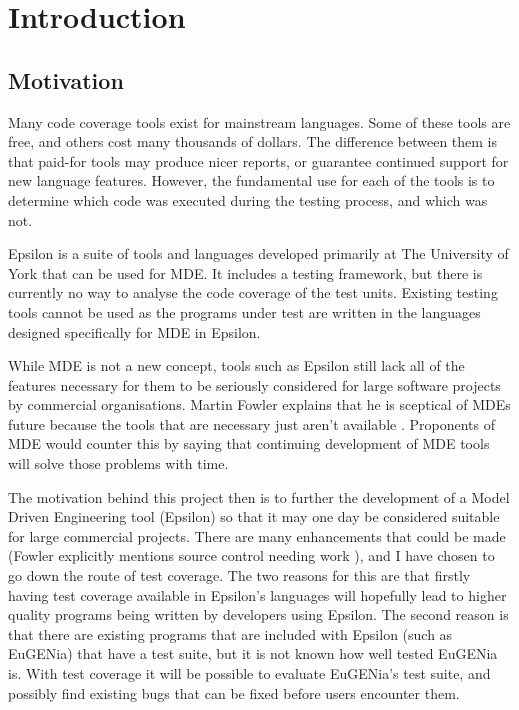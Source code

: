 \chapter{Introduction}

\section{Motivation}

Many code coverage tools exist for mainstream languages. Some of these tools are free, and others cost many thousands of dollars. The difference between them is that paid-for tools may produce nicer reports, or guarantee continued support for new language features. However, the fundamental use for each of the tools is to determine which code was executed during the testing process, and which was not.

Epsilon is a suite of tools and languages developed primarily at The University of York that can be used for \ac{MDE}. It includes a testing framework, but there is currently no way to analyse the code coverage of the test units. Existing testing tools cannot be used as the programs under test are written in the languages designed specifically for MDE in Epsilon.

While \ac{MDE} is not a new concept, tools such as Epsilon still lack all of the features necessary for them to be seriously considered for large software projects by commercial organisations. Martin Fowler explains that he is sceptical of \acp{MDE} future because the tools that are necessary just aren't available \cite{fowlerMDE}. Proponents of \ac{MDE} would counter this by saying that continuing development of \ac{MDE} tools will solve those problems with time.

The motivation behind this project then is to further the development of a Model Driven Engineering tool (Epsilon) so that it may one day be considered suitable for large commercial projects. There are many enhancements that could be made (Fowler explicitly mentions source control needing work \cite{fowlerMDE}), and I have chosen to go down the route of test coverage. The two reasons for this are that firstly having test coverage available in Epsilon's languages will hopefully lead to higher quality programs being written by developers using Epsilon. The second reason is that there are existing programs that are included with Epsilon (such as EuGENia) that have a test suite, but it is not known how well tested EuGENia is. With test coverage it will be possible to evaluate EuGENia's test suite, and possibly find existing bugs that can be fixed before users encounter them.

